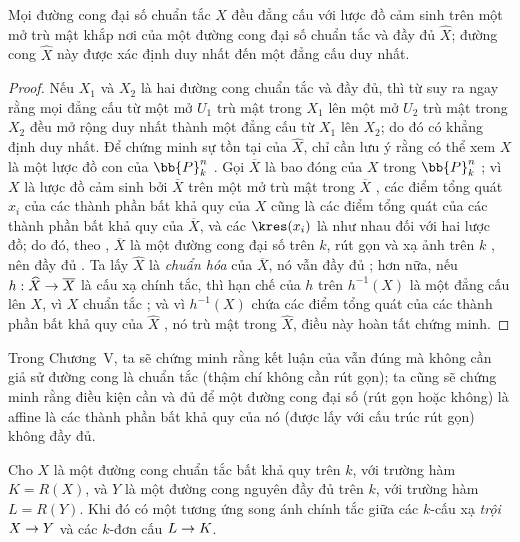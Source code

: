 \documentclass[oneside,10pt]{amsart}
\makeatletter
\newcommand{\ega@arrow}[2]{\mathchoice{#1}{#2}{#2}{#2}}
\renewcommand{\to}{\ega@arrow{\longrightarrow}{\rightarrow}}
\newcommand{\oldpage}[2][]{\marginnote{\normalfont\footnotesize\textbf{#1}~|~#2}\ignorespaces}
\let\EGAOriginalLabel\label
\renewcommand{\label}[1]{\phantomsection\EGAOriginalLabel{#1}}
\makeatother
\begin{document}
\begin{corollary}[7.4.11]
\label{II.7.4.11}
Mọi đường cong đại số chuẩn tắc $X$ đều đẳng cấu với lược đồ cảm sinh trên một mở trù mật khắp nơi của một đường cong đại số chuẩn tắc và đầy đủ $\widehat{X}$; đường cong $\widehat{X}$ này được xác định duy nhất đến một đẳng cấu duy nhất.
\end{corollary}

\begin{proof}
Nếu $X_1$ và $X_2$ là hai đường cong chuẩn tắc và đầy đủ, thì từ  suy ra ngay rằng mọi đẳng cấu từ một mở $U_1$ trù mật trong $X_1$ lên một mở $U_2$ trù mật trong $X_2$ đều mở rộng duy nhất thành một đẳng cấu từ $X_1$ lên $X_2$;
do đó có khẳng định duy nhất.
Để chứng minh sự tồn tại của $\widehat{X}$, chỉ cần lưu ý rằng có thể xem $X$ là một lược đồ con của $\bb{P}_k^n$ .
Gọi $\overline{X}$ là bao đóng của $X$ trong $\bb{P}_k^n$ ;
vì $X$ là lược đồ cảm sinh bởi $\overline{X}$ trên một mở trù mật trong $\overline{X}$ , các điểm tổng quát $x_i$ của các thành phần bất khả quy của $X$ cũng là các điểm tổng quát của các thành phần bất khả quy của $\overline{X}$, và các $\kres(x_i)$ là như nhau đối với hai lược đồ; do đó, theo , $\overline{X}$ là một đường cong đại số trên $k$, rút gọn  và xạ ảnh trên $k$ , nên đầy đủ .
Ta lấy $\widehat{X}$ là \emph{chuẩn hóa} của $\overline{X}$, nó vẫn đầy đủ ;
hơn nữa, nếu $h:\widehat{X}\to\overline{X}$ là cấu xạ chính tắc, thì hạn chế của $h$ trên $h^{-1}(X)$ là một đẳng cấu lên $X$, vì $X$ chuẩn tắc ; và vì $h^{-1}(X)$ chứa các điểm tổng quát của các thành phần bất khả quy của $\widehat{X}$ , nó trù mật trong $\widehat{X}$, điều này hoàn tất chứng minh.
\end{proof}

\oldpage[II]{151}
\begin{remark}[7.4.12]
\label{II.7.4.12}
Trong Chương~V, ta sẽ chứng minh rằng kết luận của  vẫn đúng mà không cần giả sử đường cong là chuẩn tắc (thậm chí không cần rút gọn);
ta cũng sẽ chứng minh rằng điều kiện cần và đủ để một đường cong đại số (rút gọn hoặc không) là affine là các thành phần bất khả quy của nó (được lấy với cấu trúc rút gọn) không đầy đủ.
\end{remark}

\begin{corollary}[7.4.13]
\label{II.7.4.13}
Cho $X$ là một đường cong chuẩn tắc bất khả quy trên $k$, với trường hàm $K=R(X)$, và $Y$ là một đường cong nguyên đầy đủ trên $k$, với trường hàm $L=R(Y)$.
Khi đó có một tương ứng song ánh chính tắc giữa các $k$-cấu xạ \emph{trội} $X\to Y$ và các $k$-đơn cấu $L\to K$.
\end{corollary}
\end{document}
